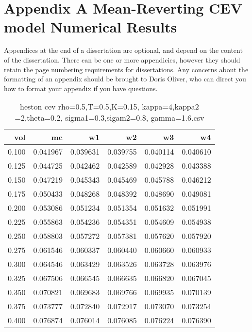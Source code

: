 \chapter{Appendix A Mean-Reverting CEV model Numerical Results}
\label{mrcev}
\noindent Appendices at the end of a dissertation are optional, and depend on the content of the dissertation. There can be one or more appendicies, however they should retain the page numbering requirements for dissertations.  Any concerns about the formatting of an appendix should be brought to Doris Oliver, who can direct you how to format your appendix if you have questions.

\begin{table}
  \centering
  \caption{heston cev rho=0.5,T=0.5,K=0.15, kappa=4,kappa2 =2,theta=0.2, sigma1=0.3,sigam2=0.8, gamma=1.6.csv}
  \begin{tabular}{rrrrrr}
  \toprule
    vol &       mc &       w1 &       w2 &       w3 &       w4 \\
  \midrule
  0.100 & 0.041967 & 0.039631 & 0.039755 & 0.040114 & 0.040610 \\
  0.125 & 0.044725 & 0.042462 & 0.042589 & 0.042928 & 0.043388 \\
  0.150 & 0.047219 & 0.045343 & 0.045469 & 0.045788 & 0.046212 \\
  0.175 & 0.050433 & 0.048268 & 0.048392 & 0.048690 & 0.049081 \\
  0.200 & 0.053086 & 0.051234 & 0.051354 & 0.051632 & 0.051991 \\
  0.225 & 0.055863 & 0.054236 & 0.054351 & 0.054609 & 0.054938 \\
  0.250 & 0.058803 & 0.057272 & 0.057381 & 0.057620 & 0.057920 \\
  0.275 & 0.061546 & 0.060337 & 0.060440 & 0.060660 & 0.060933 \\
  0.300 & 0.064546 & 0.063429 & 0.063526 & 0.063728 & 0.063976 \\
  0.325 & 0.067506 & 0.066545 & 0.066635 & 0.066820 & 0.067045 \\
  0.350 & 0.070821 & 0.069683 & 0.069766 & 0.069935 & 0.070139 \\
  0.375 & 0.073777 & 0.072840 & 0.072917 & 0.073070 & 0.073254 \\
  0.400 & 0.076874 & 0.076014 & 0.076085 & 0.076224 & 0.076390 \\
  \bottomrule
  \end{tabular}
\end{table}

